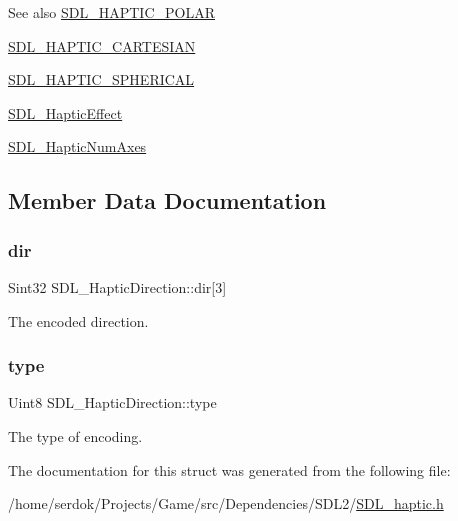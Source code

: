 \begin{DoxySeeAlso}{See also}
\hyperlink{SDL__haptic_8h_acdc35e97e5525472054a67b76e518f3b}{S\+D\+L\+\_\+\+H\+A\+P\+T\+I\+C\+\_\+\+P\+O\+L\+AR} 

\hyperlink{SDL__haptic_8h_af8b2430a363a968de2a5b64c8f663d3b}{S\+D\+L\+\_\+\+H\+A\+P\+T\+I\+C\+\_\+\+C\+A\+R\+T\+E\+S\+I\+AN} 

\hyperlink{SDL__haptic_8h_a1fcf7cb0eaf3c39b16ba266054e25aff}{S\+D\+L\+\_\+\+H\+A\+P\+T\+I\+C\+\_\+\+S\+P\+H\+E\+R\+I\+C\+AL} 

\hyperlink{unionSDL__HapticEffect}{S\+D\+L\+\_\+\+Haptic\+Effect} 

\hyperlink{SDL__haptic_8h_ad6705645197f6df4eeeea32392462483}{S\+D\+L\+\_\+\+Haptic\+Num\+Axes} 
\end{DoxySeeAlso}


\subsection{Member Data Documentation}
\mbox{\label{structSDL__HapticDirection_a6cebd8118a3e61e36bd0c503ae020362}} 
\subsubsection{\texorpdfstring{dir}{dir}}
{\footnotesize\ttfamily Sint32 S\+D\+L\+\_\+\+Haptic\+Direction\+::dir\mbox{[}3\mbox{]}}

The encoded direction. \mbox{\label{structSDL__HapticDirection_acd6830ad68c4ba2af16057fa418087cc}} 
\subsubsection{\texorpdfstring{type}{type}}
{\footnotesize\ttfamily Uint8 S\+D\+L\+\_\+\+Haptic\+Direction\+::type}

The type of encoding. 

The documentation for this struct was generated from the following file\+:\begin{DoxyCompactItemize}
\item 
/home/serdok/\+Projects/\+Game/src/\+Dependencies/\+S\+D\+L2/\hyperlink{SDL__haptic_8h}{S\+D\+L\+\_\+haptic.\+h}\end{DoxyCompactItemize}

